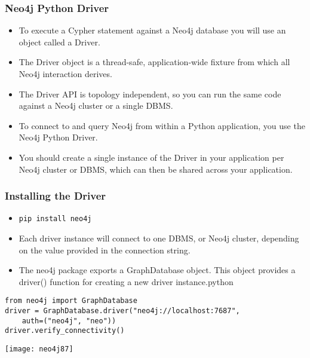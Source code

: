 \begin{frame}[fragile]\frametitle{Neo4j Python Driver}
\begin{itemize}
\item To execute a Cypher statement against a Neo4j database you will use an object called a Driver.
\item The Driver object is a thread-safe, application-wide fixture from which all Neo4j interaction derives.
\item The Driver API is topology independent, so you can run the same code against a Neo4j cluster or a single DBMS.
\item To connect to and query Neo4j from within a Python application, you use the Neo4j Python Driver.
\item You should create a single instance of the Driver in your application per Neo4j cluster or DBMS, which can then be shared across your application.
\end{itemize}

\end{frame}

\begin{frame}[fragile]\frametitle{Installing the Driver}
\begin{itemize}
\item \lstinline|pip install neo4j|
\item Each driver instance will connect to one DBMS, or Neo4j cluster, depending on the value provided in the connection string.
\item The neo4j package exports a GraphDatabase object. This object provides a driver() function for creating a new driver instance.python
\end{itemize}

\begin{lstlisting}
from neo4j import GraphDatabase
driver = GraphDatabase.driver("neo4j://localhost:7687",
    auth=("neo4j", "neo"))
driver.verify_connectivity()
\end{lstlisting}

\begin{center}
\texttt{[image: neo4j87]}
\end{center}	  

\end{frame}

